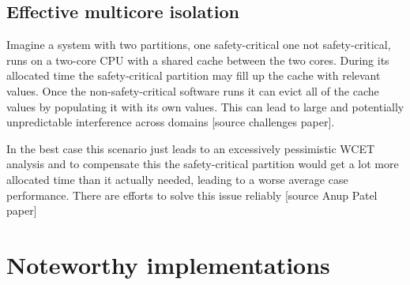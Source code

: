 \subsection{Effective multicore isolation}
Imagine a system with two partitions, one safety-critical one not safety-critical, runs on a two-core \gls{CPU} with a shared cache between the two cores. During its allocated time the safety-critical partition may fill up the cache with relevant values. Once the non-safety-critical software runs it can evict all of the cache values by populating it with its own values. This can lead to large and potentially unpredictable interference across domains [source challenges paper].

In the best case this scenario just leads to an excessively pessimistic \gls{WCET} analysis and to compensate this the safety-critical partition would get a lot more allocated time than it actually needed, leading to a worse average case performance. There are efforts to solve this issue reliably [source Anup Patel paper]


\section{Noteworthy implementations}
